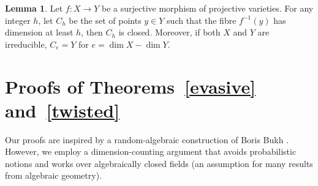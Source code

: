 \documentclass[11pt]{article}
\theoremstyle{definition}
\newtheorem{lemma}[theorem]{Lemma}
\begin{document}
\begin{lemma}\label{fiberdimension}
    Let $f:X\to Y$ be a surjective morphism of projective varieties. For any integer $h$, let $C_h$ be the set of points $y\in Y$ such that the fibre $f^{-1}(y)$ has dimension at least $h$, then $C_h$ is closed. Moreover, if both $X$ and $Y$ are irreducible, $C_e = Y$ for $e = \dim X-\dim Y$.
\end{lemma}


\section{Proofs of Theorems~\ref{evasive} and~\ref{twisted}}\label{sec:boris}

Our proofs are inspired by a random-algebraic construction of Boris Bukh \cite{bukh2024extremal}. However, we employ a dimension-counting argument that avoids probabilistic notions and works over algebraically closed fields (an assumption for many results from algebraic geometry).
\end{document}
